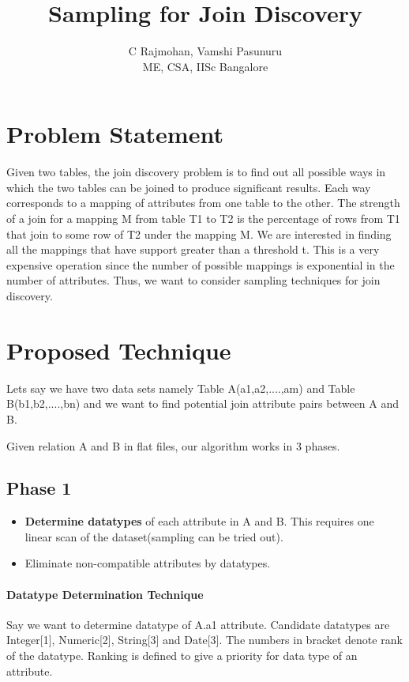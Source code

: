 \documentclass{article}
\begin{document}
\title{\Large \bf Sampling for Join Discovery}

\author{C Rajmohan, Vamshi Pasunuru\\
ME, CSA, IISc Bangalore}
\date{}

\maketitle

\section{Problem Statement}
Given two tables, the join discovery problem is to find out all possible ways in which the two tables can be joined to produce significant results. Each way corresponds to a mapping
of attributes from one table to the other. The strength of a join for a mapping M from table T1 to T2 is the percentage of rows from T1 that join to some row of T2 under the mapping M. We are interested in finding all the mappings that have support greater than a threshold t. This is a very expensive operation since the number of possible mappings is exponential in the number of attributes. Thus, we want to consider sampling techniques for join discovery.

\section{Proposed Technique}
Lets say we have two data sets namely Table A(a1,a2,....,am) and Table B(b1,b2,....,bn)
and we want to find potential join attribute pairs between A and B.

Given relation A and B in flat files, our algorithm works in 3 phases.

\subsection{Phase 1}

\begin{itemize}
\item \textbf{Determine datatypes} of each attribute in A and B. This requires one linear scan of the dataset(sampling can be tried out).

\item Eliminate non-compatible attributes by datatypes.
\end{itemize}

\paragraph{Datatype Determination Technique}
Say we want to determine datatype of A.a1 attribute. Candidate datatypes are Integer[1], Numeric[2], String[3] and Date[3]. The numbers in bracket denote rank of the datatype. Ranking is defined to give a priority for data type of an attribute. 
\end{document}
